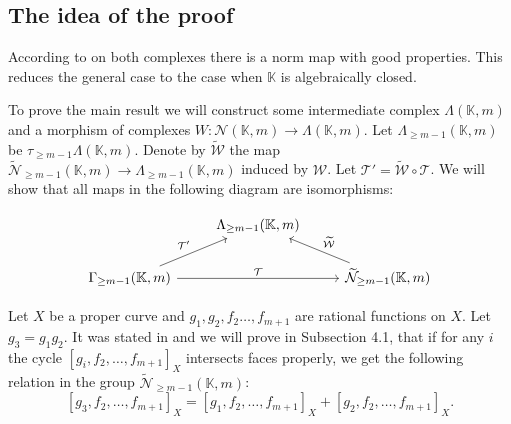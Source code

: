 \documentclass[12pt]{extarticle}
\newtheorem{remark}[theorem]{Remark}
\def\mb{\mathbb}
\def\mc{\mathcal}
\def\L{\Lambda}
\def\k{\mb K}
\def\Q{\mb Q}
\def\N{\mc N}
\def\cl{\colon}
\def\wt{\widetilde}
\def\T{\mc T}
\def\W{\mc W}
\def \tW{\wt{\W}}
\def \wL{\L_{\geq m-1}}
\def \CH{\mc{N}}
\def \wCH{\wt{\CH}_{\geq m-1}}
\def \wG{\Gamma_{\geq m-1}}
\begin{document}


\subsection{The idea of the proof}
According to \cite{rudenko2021strong,bloch1986algebraic} on both complexes there is a norm map with good properties. This reduces the general case to the case when $\k$ is algebraically closed. 

To prove the main result we will construct some intermediate complex $\L(\k,m)$ and a morphism of complexes $W\cl \N(\k,m)\to \L(\k,m)$. Let $\wL(\k,m)$ be $\tau_{\geq m-1}\L(\k,m)$. Denote by $\wt{\mc W}$ the map $\wCH(\k,m)\to \wL(\k,m)$ induced by $\mc W$. Let $\mc T'=\wt{\mc W}\circ\mc T$. We will show that all maps in the following diagram are isomorphisms:

\begin{equation}
    \label{diagram:main_triangle}
        \begin{tikzcd}
             & \wL(\k,m)\ar[dl,leftarrow,"\T'"'] \ar[dr,leftarrow,"\tW"] &\\
             \wG(\k,m)\ar[rr,"\T"] &   & \wCH(\k,m)
        \end{tikzcd}
        \end{equation}

Let $X$ be a proper curve and $g_1,g_2,f_2\dots,f_{m+1}$ are rational functions on $X$. Let $g_3=g_1g_2$. It was stated in \cite{cubical1999herbert} and we will prove in Subsection 4.1, that if for any $i$ the cycle $[g_i,f_2,\dots, f_{m+1}]_X$ intersects faces properly, we get the following relation in the group $\wCH(\k,m)$:
\begin{equation}
\label{formula:multiplicative_relation}
    [g_3,f_2,\dots, f_{m+1}]_X=[g_1,f_2,\dots, f_{m+1}]_X+[g_2,f_2,\dots, f_{m+1}]_X.
\end{equation}
\end{document}
